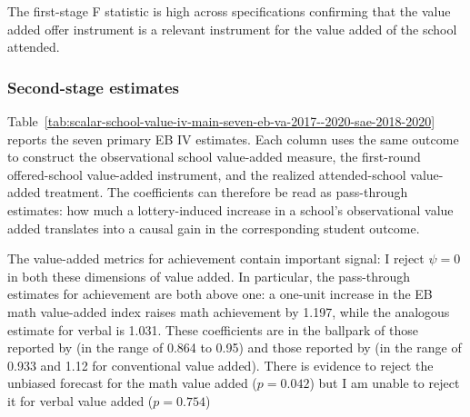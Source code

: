 \documentclass[a4paper, article, english, oneside, unknownkeysallowed, 12pt]{memoir}
\begin{document}





The first-stage F statistic is high across specifications confirming that the value added offer instrument is a relevant instrument for the value added of the school attended.


\subsubsection{Second-stage estimates}

Table~\ref{tab:scalar-school-value-iv-main-seven-eb-va-2017--2020-sae-2018-2020} reports the seven primary EB IV estimates.
Each column uses the same outcome to construct the observational school value-added measure, the first-round offered-school value-added instrument, and the realized attended-school value-added treatment.
The coefficients can therefore be read as pass-through estimates: how much a lottery-induced increase in a school's observational value added translates into a causal gain in the corresponding student outcome.



The value-added metrics for achievement contain important signal: I reject $\psi = 0$ in both these dimensions of value added.
In particular, the pass-through estimates for achievement are both above one: a one-unit increase in the EB math value-added index raises math achievement by 1.197, while the analogous estimate for verbal is 1.031.
These coefficients are in the ballpark of those reported by \textcite{angrist_leveraging_2017} (in the range of 0.864 to 0.95) and those reported by \textcite{angrist_credible_2024} (in the range of 0.933 and 1.12 for conventional value added).
There is evidence to reject the unbiased forecast for the math value added ($p = 0.042$) but I am unable to reject it for verbal value added  ($p = 0.754$)
\end{document}
